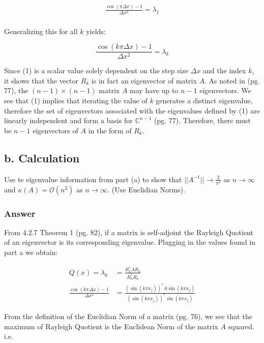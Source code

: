 \documentclass{article}
\begin{document}
	\begin{align*}
		\frac{\cos(\pi\Delta x)-1}{\Delta x^2}=\lambda_{1}\\
	\end{align*}
	
	Generalizing this for all $k$ yields:
	
	\begin{equation}
		\frac{\cos(k\pi\Delta x)-1}{\Delta x^2}=\lambda_{k}
	\end{equation}
	
	Since (1) is a scalar value solely dependent on the step size $\Delta x$ and the index $k$, it shows that the vector $R_{k}$ is in fact an eigenvector of matrix $A$.  As noted in \cite{BG}(pg. 77), the $(n-1)\times(n-1)$ matrix $A$ may have up to $n-1$ eigenvectors.  We see that (1) implies that iterating the value of $k$ generates a distinct eigenvalue, therefore the set of eigenvectors associated with the eigenvalues defined by (1) are linearly independent and form a basis for $\mathbb{C}^{n-1}$ \cite{BG}(pg. 77).  Therefore, there must be $n-1$ eigenvectors of $A$ in the form of $R_{k}$.

	\subsection{b. Calculation}
	Use te eigenvalue information from part (a) to show that $||A^{-1}||\rightarrow\frac{2}{\pi^{2}}$ as $n\rightarrow\infty$ and $\kappa(A)=\mathcal{O}(n^{2})$ as $n\rightarrow\infty$.  (Use Euclidian Norms). 
	
	\subsubsection{Answer}	
	
	 From 4.2.7 Theorem 1 \cite{BG}(pg. 82), if a matrix is self-adjoint the Rayleigh Quotient of an eigenvector is its corresponding eigenvalue.  Plugging in the values found in part a we obtain:
	
	\begin{align*}
		Q(x)=\lambda_{k}&=\frac{R_{k}^{*}AR_{k}}{R_{k}^{*}R_{k}}\\
		\frac{\cos(k\pi\Delta x)-1}{\Delta x^{2}}&=\frac{(\sin(k\pi x_{j}))^{*} A\sin(k\pi x_{j})}{(\sin(k\pi x_{j}))^{*}\sin(k\pi x_{j})}
	\end{align*}
	
	From the definition of the Euclidian Norm of a matrix \cite{BG}(pg. 76), we see that the maximum of Rayleigh Quotient is the Euclidean Norm of the matrix $A$ squared.  i.e.
	
\end{document}
